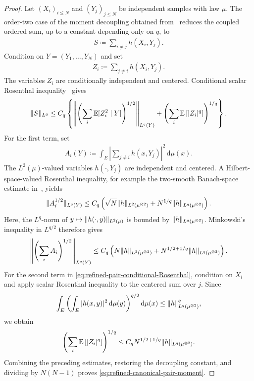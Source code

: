 \documentclass[11pt,reqno]{amsart}
\numberwithin{equation}{section}
\theoremstyle{plain}
\theoremstyle{remark}
\DeclarePairedDelimiter{\pa}{\lparen}{\rparen}
\DeclarePairedDelimiter{\norm}{\lVert}{\rVert}
\newcommand{\md}{\mathrm{d}}
\newcommand{\E}{{\mathbb{E}}}
\begin{document}
\begin{proof}
Let \((X_i)_{i\le N}\) and \((Y_j)_{j\le N}\) be independent samples with law \(\mu\).  The order-two case of the moment decoupling obtained from~\cite[Theorem~1]{dPmS1995} reduces the coupled ordered sum, up to a constant depending only on \(q\), to
\begin{align}\label{eq:refined-pair-decoupled-sum}
 S\coloneqq\sum_{i\ne j}h(X_i,Y_j).
\end{align}
Condition on \(Y=(Y_1,\ldots,Y_N)\) and set
\begin{align}\label{eq:refined-pair-Zi}
 Z_i\coloneqq\sum_{j\ne i}h(X_i,Y_j).
\end{align}
The variables \(Z_i\) are conditionally independent and centered.  Conditional scalar Rosenthal inequality~\cite{Rosenthal1970} gives
\begin{align}\label{eq:refined-pair-conditional-Rosenthal}
 \norm{S}_{L^q}
 \le C_q\left\{
 \norm*{\pa*{\sum_i\E[Z_i^2\mid Y]}^{1/2}}_{L^q(Y)}
 +\pa*{\sum_i\E\left[|Z_i|^q\right]}^{1/q}
 \right\}.
\end{align}
For the first term, set
\begin{align}\label{eq:refined-pair-Ai}
 A_i(Y)\coloneqq
 \int_E\left|\sum_{j\ne i}h(x,Y_j)\right|^2\,\md\mu(x).
\end{align}
The \(L^2(\mu)\)-valued variables \(h(\cdot,Y_j)\) are independent and centered.  A Hilbert-space-valued Rosenthal inequality, for example the two-smooth Banach-space estimate in~\cite{Pinelis2015Rosenthal}, yields
\begin{align}\label{eq:refined-pair-Hilbert-Rosenthal}
 \norm{A_i^{1/2}}_{L^q(Y)}
 \le C_q\left(
 \sqrt N\norm{h}_{L^2(\mu^{\otimes2})}
 +N^{1/q}\norm{h}_{L^q(\mu^{\otimes2})}
 \right).
\end{align}
Here, the \(L^q\)-norm of \(y\mapsto\norm{h(\cdot,y)}_{L^2(\mu)}\) is bounded by \(\norm h_{L^q(\mu^{\otimes2})}\).  Minkowski's inequality in \(L^{q/2}\) therefore gives
\begin{align}\label{eq:refined-pair-first-term}
 \norm*{\pa*{\sum_iA_i}^{1/2}}_{L^q(Y)}
 \le C_q\left(
 N\norm{h}_{L^2(\mu^{\otimes2})}
 +N^{1/2+1/q}\norm{h}_{L^q(\mu^{\otimes2})}
 \right).
\end{align}
For the second term in \eqref{eq:refined-pair-conditional-Rosenthal}, condition on \(X_i\) and apply scalar Rosenthal inequality to the centered sum over \(j\).  Since
\begin{align}\label{eq:refined-pair-mixed-bound}
 \int_E\left(
 \int_E|h(x,y)|^2\,\md\mu(y)
 \right)^{q/2}\md\mu(x)
 \le \norm{h}_{L^q(\mu^{\otimes2})}^q,
\end{align}
we obtain
\begin{align}\label{eq:refined-pair-second-term}
 \pa*{\sum_i\E\left[|Z_i|^q\right]}^{1/q}
 \le C_qN^{1/2+1/q}\norm{h}_{L^q(\mu^{\otimes2})}.
\end{align}
Combining the preceding estimates, restoring the decoupling constant, and dividing by \(N(N-1)\) proves \eqref{eq:refined-canonical-pair-moment}.
\end{proof}
\end{document}
